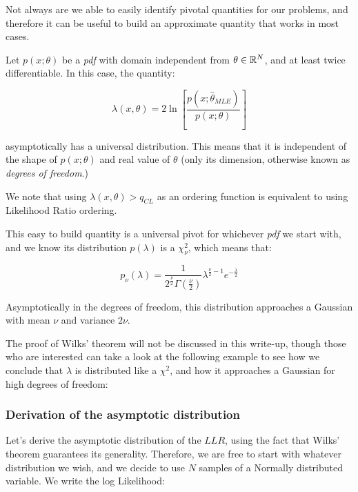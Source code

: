 Not always are we able to easily identify pivotal quantities for our problems, and therefore it can be useful to build an approximate quantity that works in most cases.

\begin{theorem}
	Let $p(x;\theta)$ be a \emph{pdf} with domain independent from $\theta\in \mathbb{R}^N$, and at least twice differentiable. In this case, the quantity:
	
	\begin{equation}
	\lambda\left(x,\theta\right) = 2\ln\left[\frac{ p(x;\hat{\theta}_{MLE})}{p(x;\theta)}\right]
	\tag{Log-Likelihood ratio}
	\end{equation}
	
	asymptotically has a universal distribution. This means that it is independent of the shape of $p(x;\theta)$ and real value of $\theta$ (only its dimension, otherwise known as \emph{degrees of freedom}.)
\end{theorem}

We note that using $\lambda(x,\theta)> q_{CL}$ as an ordering function is equivalent to using Likelihood Ratio ordering.

This easy to build quantity is a universal pivot for whichever \emph{pdf} we start with, and we know its distribution $p(\lambda)$ is a $\chi^2_\nu$, which means that:

	\begin{equation}
	p_\nu(\lambda) = \frac{1}{2^{\frac{\nu}{2}} \Gamma(\frac{\nu}{2})}\lambda^{\frac{\nu}{2}-1}e^{-\frac{\lambda}{2}}
	\label{eq:chi_squared}
	\end{equation}

Asymptotically in the degrees of freedom, this distribution approaches a Gaussian with mean $\nu$ and variance $2\nu$. 

The proof of Wilks' theorem will not be discussed in this write-up, though those who are interested can take a look at the following example to see how we conclude that $\lambda$ is distributed like a $\chi^2$, and how it approaches a Gaussian for high degrees of freedom:

\subsubsection{Derivation of the asymptotic distribution}
Let's derive the asymptotic distribution of the $LLR$, using the fact that Wilks' theorem guarantees its generality. Therefore, we are free to start with whatever distribution we wish, and we decide to use $N$ samples of a Normally distributed variable. We write the log Likelihood:
	
